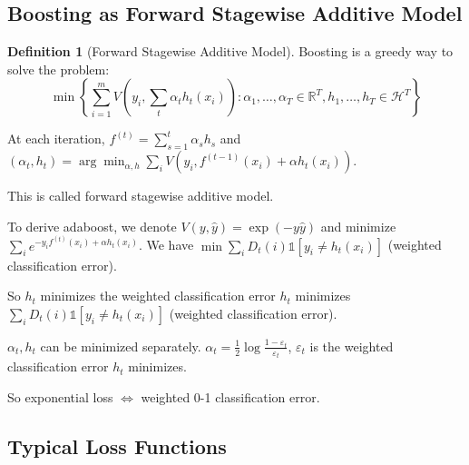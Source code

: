 \documentclass[12pt,a4paper]{article}
\theoremstyle{definition}
\newtheorem{definition}{Definition}[section]
\begin{document}
\subsection{Boosting as Forward Stagewise Additive Model}

\begin{definition}[Forward Stagewise Additive Model]
Boosting is a greedy way to solve the problem:
\[
\min \left\{\sum_{i=1}^m V(y_i, \sum_t \alpha_t h_t(x_i)) : \alpha_1, \ldots, \alpha_T \in \mathbb{R}^T, h_1, \ldots, h_T \in \mathcal{H}^T\right\}
\]

At each iteration, $f^{(t)} = \sum_{s=1}^t \alpha_s h_s$ and $(\alpha_t, h_t) = \arg\min_{\alpha, h} \sum_i V(y_i, f^{(t-1)}(x_i) + \alpha h_t(x_i))$.

This is called forward stagewise additive model.

To derive adaboost, we denote $V(y, \hat{y}) = \exp(-y\hat{y})$ and minimize $\sum_i e^{-y_i f^{(t)}(x_i) + \alpha h_t(x_i)}$. We have $\min \sum_i D_t(i) \mathbb{1}[y_i \neq h_t(x_i)]$ (weighted classification error).

So $h_t$ minimizes the weighted classification error $h_t$ minimizes $\sum_i D_t(i) \mathbb{1}[y_i \neq h_t(x_i)]$ (weighted classification error).

$\alpha_t, h_t$ can be minimized separately. $\alpha_t = \frac{1}{2} \log \frac{1-\varepsilon_t}{\varepsilon_t}$, $\varepsilon_t$ is the weighted classification error $h_t$ minimizes.

So exponential loss $\Leftrightarrow$ weighted 0-1 classification error.
\end{definition}

\subsection{Typical Loss Functions}
\end{document}
